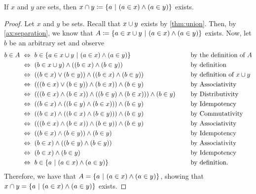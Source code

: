 \begin{theorem}\label{thm:intersection}
    If $x$ and $y$ are sets,
    then $x \intersect y \defn \set*{a \suchthat (a \in x) \meet (a \in y)}$ exists.
\end{theorem}
\begin{proof}
    Let $x$ and $y$ be sets. Recall that $x \cup y$ exists by \autoref{thm:union}.
    Then, by \autoref{ax:separation},
    we know that $A \defn \set*{a \in x \union y \suchthat (a \in x) \meet (a \in y)}$ exists.
    Now, let $b$ be an arbitrary set and observe
    \begin{alignat*}{2}
        b \in A &\iff b \in \set*{a \in x \union y \suchthat (a \in x) \meet (a \in y)} &&\text{by the definition of $A$} \\
                &\iff (b \in x \union y) \meet \pn*{(b \in x) \meet (b \in y)} &&\text{by definition} \\
                &\iff \pn*{(b \in x) \join (b \in y)} \meet \pn*{(b \in x) \meet (b \in y)} &&\text{by definition of } x \union y \\
                &\iff \pn*{\pn*{(b \in x) \join (b \in y)} \meet (b \in x)} \meet (b \in y) &&\text{by Associativity} \\
                &\iff \pn*{\pn*{(b \in x) \meet (b \in x)} \meet \pn*{(b \in y) \meet (b \in x)}} \meet (b \in y)~~~~&&\text{by Distributivity} \\
                &\iff \pn*{(b \in x) \meet \pn*{(b \in y) \meet (b \in x)}} \meet (b \in y) &&\text{by Idempotency} \\
                &\iff \pn*{(b \in x) \meet \pn*{(b \in x) \meet (b \in y)}} \meet (b \in y) &&\text{by Commutativity} \\
                &\iff \pn*{\pn*{(b \in x) \meet (b \in x)} \meet (b \in y)} \meet (b \in y) &&\text{by Associativity} \\
                &\iff \pn*{(b \in x) \meet (b \in y)} \meet (b \in y) &&\text{by Idempotency} \\
                &\iff (b \in x) \meet \pn*{(b \in y) \meet (b \in y)} &&\text{by Associativity} \\
                &\iff (b \in x) \meet (b \in y) &&\text{by Idempotency} \\
                &\iff b \in \set*{a \suchthat (a \in x) \meet (a \in y)} &&\text{by definition}.
    \end{alignat*}
    Therefore, we have that $A = \set*{a \suchthat (a \in x) \meet (a \in y)}$,
    showing that $x \intersect y = \set*{a \suchthat (a \in x) \meet (a \in y)}$ exists.
\end{proof}

